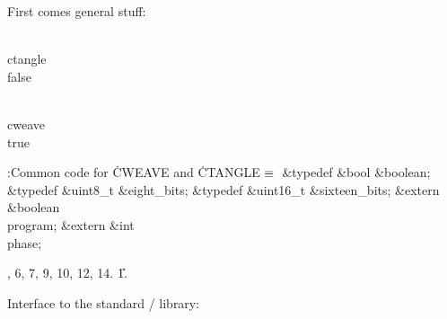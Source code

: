 






First comes general stuff:



\Y\B\4\D\\{ctangle}\5
\\{false}\par
\B\4\D\\{cweave}\5
\\{true}\par
\Y\B\4:Common code for \.{CWEAVE} and \.{CTANGLE}\X${}\equiv{}$\6
\&{typedef} \&{bool} \&{boolean};\6
\&{typedef} \&{uint8\_t} \&{eight\_bits};\6
\&{typedef} \&{uint16\_t} \&{sixteen\_bits};\6
\&{extern} \&{boolean} \\{program};\6
\&{extern} \&{int} \\{phase};\par
{}, 6, 7, 9, 10, 12, 14.
\U1.\fi

Interface to the standard \CEE/ library:

